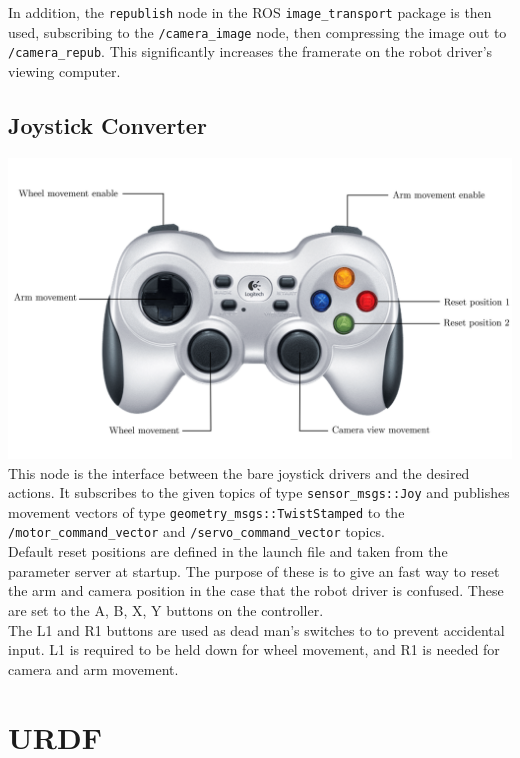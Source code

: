 \documentclass[titlepage,12pt,a4paper]{article}
\begin{document}
\noindent In addition, the \texttt{republish} node in the ROS \texttt{image\_transport} package is then used, subscribing to the \texttt{/camera\_image} node, then compressing the image out to \texttt{/camera\_repub}. This significantly increases the framerate on the robot driver's viewing computer.

\subsection*{Joystick Converter}
\includegraphics[width=\textwidth]{gamepadedit}
This node is the interface between the bare joystick drivers and the desired actions. It subscribes to the given topics of type \texttt{sensor\_msgs::Joy} and publishes movement vectors of type \texttt{geometry\_msgs::TwistStamped} to the \texttt{/motor\_command\_vector} and \texttt{/servo\_command\_vector} topics.\\

\noindent Default reset positions are defined in the launch file and taken from the parameter server at startup. The purpose of these is to give an fast way to reset the arm and camera position in the case that the robot driver is confused. These are set to the A, B, X, Y buttons on the controller. \\

\noindent The L1 and R1 buttons are used as dead man's switches to to prevent accidental input. L1 is required to be held down for wheel movement, and R1 is needed for camera and arm movement.\\

\section*{URDF}
\end{document}
